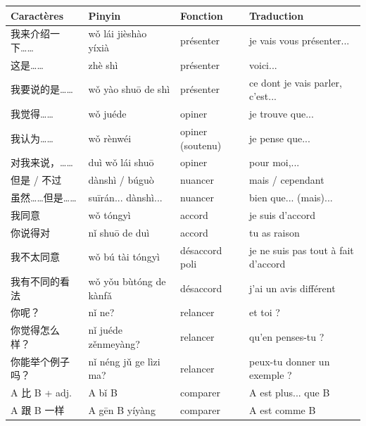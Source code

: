 \documentclass[11pt]{article}
\begin{document}
\begin{center}
\begin{tabularx}{\linewidth}{|X|X|X|X|}
\hline
\rowcolor{popblueL} Caractères & Pinyin & Fonction & Traduction \\
\hline
我来介绍一下…… & wǒ lái jièshào yíxià & présenter & je vais vous présenter... \\
\hline
这是…… & zhè shì & présenter & voici... \\
\hline
我要说的是…… & wǒ yào shuō de shì & présenter & ce dont je vais parler, c'est... \\
\hline
我觉得…… & wǒ juéde & opiner & je trouve que... \\
\hline
我认为…… & wǒ rènwéi & opiner (soutenu) & je pense que... \\
\hline
对我来说，…… & duì wǒ lái shuō & opiner & pour moi,... \\
\hline
但是 / 不过 & dànshì / búguò & nuancer & mais / cependant \\
\hline
虽然……但是…… & suīrán... dànshì... & nuancer & bien que... (mais)... \\
\hline
我同意 & wǒ tóngyì & accord & je suis d'accord \\
\hline
你说得对 & nǐ shuō de duì & accord & tu as raison \\
\hline
我不太同意 & wǒ bú tài tóngyì & désaccord poli & je ne suis pas tout à fait d'accord \\
\hline
我有不同的看法 & wǒ yǒu bùtóng de kànfǎ & désaccord & j'ai un avis différent \\
\hline
你呢？ & nǐ ne? & relancer & et toi ? \\
\hline
你觉得怎么样？ & nǐ juéde zěnmeyàng? & relancer & qu'en penses-tu ? \\
\hline
你能举个例子吗？ & nǐ néng jǔ ge lìzi ma? & relancer & peux-tu donner un exemple ? \\
\hline
A 比 B + adj. & A bǐ B & comparer & A est plus... que B \\
\hline
A 跟 B 一样 & A gēn B yíyàng & comparer & A est comme B \\
\hline
\end{tabularx}
\end{center}
\end{document}
